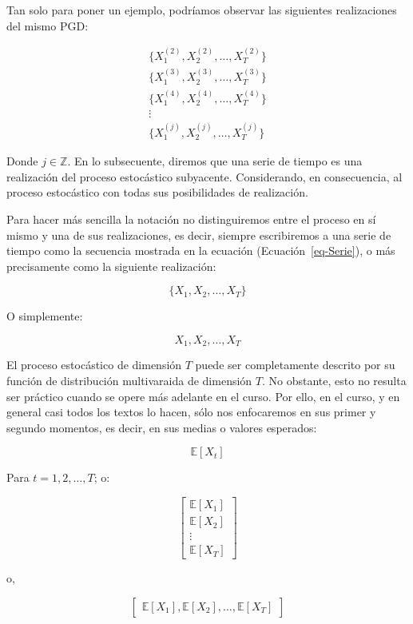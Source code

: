 \documentclass[
  a4paper,
]{article}
\begin{document}
Tan solo para poner un ejemplo, podríamos observar las siguientes
realizaciones del mismo PGD:

\begin{eqnarray*}
  & \{X^{(2)}_1, X^{(2)}_2, \ldots, X^{(2)}_T\} & \\
  & \{X^{(3)}_1, X^{(3)}_2, \ldots, X^{(3)}_T\} & \\
  & \{X^{(4)}_1, X^{(4)}_2, \ldots, X^{(4)}_T\} & \\
  & \vdots & \\
  & \{X^{(j)}_1, X^{(j)}_2, \ldots, X^{(j)}_T\} &
\end{eqnarray*}

Donde \(j \in \mathbb{Z}\). En lo subsecuente, diremos que una serie de
tiempo es una realización del proceso estocástico subyacente.
Considerando, en consecuencia, al proceso estocástico con todas sus
posibilidades de realización.

Para hacer más sencilla la notación no distinguiremos entre el proceso
en sí mismo y una de sus realizaciones, es decir, siempre escribiremos a
una serie de tiempo como la secuencia mostrada en la ecuación
(Ecuación~\ref{eq-Serie}), o más precisamente como la siguiente
realización:

\[
\{ X_1, X_2, \ldots, X_T \}
\]

O simplemente:

\[
X_1, X_2, \ldots, X_T
\]

El proceso estocástico de dimensión \(T\) puede ser completamente
descrito por su función de distribución multivaraida de dimensión \(T\).
No obstante, esto no resulta ser práctico cuando se opere más adelante
en el curso. Por ello, en el curso, y en general casi todos los textos
lo hacen, sólo nos enfocaremos en sus primer y segundo momentos, es
decir, en sus medias o valores esperados:

\[
\mathbb{E}[X_t]
\]

Para \(t = 1, 2, \ldots, T\); o:

\[
\left[
    \begin{array}{c}
    \mathbb{E}[X_1] \\
    \mathbb{E}[X_2] \\
    \vdots \\
    \mathbb{E}[X_T]
    \end{array}
\right]
\]

o,

\[
\left[
    \begin{array}{c}
    \mathbb{E}[X_1], \mathbb{E}[X_2], \ldots, \mathbb{E}[X_T]
    \end{array}
\right]
\]
\end{document}
